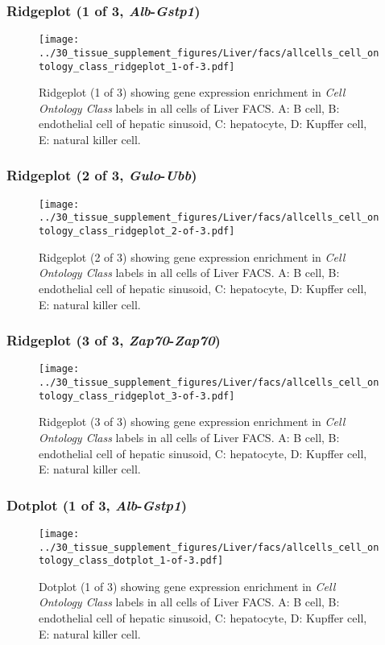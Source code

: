 \subsubsection{Ridgeplot (1 of 3, \emph{Alb}-\emph{Gstp1})}
\begin{figure}[h]
\centering
\texttt{[image: ../30\_tissue\_supplement\_figures/Liver/facs/allcells\_cell\_ontology\_class\_ridgeplot\_1-of-3.pdf]}

\caption{ Ridgeplot (1 of 3)  showing gene expression enrichment in \emph{Cell Ontology Class} labels in all cells of Liver FACS. A: B cell, B: endothelial cell of hepatic sinusoid, C: hepatocyte, D: Kupffer cell, E: natural killer cell.}
\end{figure}


\clearpage

\subsubsection{Ridgeplot (2 of 3, \emph{Gulo}-\emph{Ubb})}
\begin{figure}[h]
\centering
\texttt{[image: ../30\_tissue\_supplement\_figures/Liver/facs/allcells\_cell\_ontology\_class\_ridgeplot\_2-of-3.pdf]}

\caption{ Ridgeplot (2 of 3)  showing gene expression enrichment in \emph{Cell Ontology Class} labels in all cells of Liver FACS. A: B cell, B: endothelial cell of hepatic sinusoid, C: hepatocyte, D: Kupffer cell, E: natural killer cell.}
\end{figure}


\clearpage

\subsubsection{Ridgeplot (3 of 3, \emph{Zap70}-\emph{Zap70})}
\begin{figure}[h]
\centering
\texttt{[image: ../30\_tissue\_supplement\_figures/Liver/facs/allcells\_cell\_ontology\_class\_ridgeplot\_3-of-3.pdf]}

\caption{ Ridgeplot (3 of 3)  showing gene expression enrichment in \emph{Cell Ontology Class} labels in all cells of Liver FACS. A: B cell, B: endothelial cell of hepatic sinusoid, C: hepatocyte, D: Kupffer cell, E: natural killer cell.}
\end{figure}


\clearpage

\subsubsection{Dotplot (1 of 3, \emph{Alb}-\emph{Gstp1})}
\begin{figure}[h]
\centering
\texttt{[image: ../30\_tissue\_supplement\_figures/Liver/facs/allcells\_cell\_ontology\_class\_dotplot\_1-of-3.pdf]}

\caption{ Dotplot (1 of 3)  showing gene expression enrichment in \emph{Cell Ontology Class} labels in all cells of Liver FACS. A: B cell, B: endothelial cell of hepatic sinusoid, C: hepatocyte, D: Kupffer cell, E: natural killer cell.}
\end{figure}


